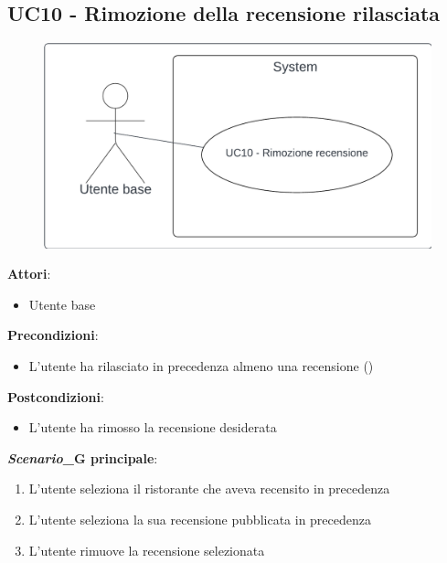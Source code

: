 \subsection{UC10 - Rimozione della recensione rilasciata} \label{usecase:10}
\begin{figure}[H]
    \centering
    \includegraphics[width=0.75\linewidth]{ucd/UCD10.png}
\end{figure}
\textbf{Attori}:
\begin{itemize}
    \item Utente base
\end{itemize}
\textbf{Precondizioni}:
\begin{itemize}
    \item L'utente ha rilasciato in precedenza almeno una recensione ()
\end{itemize}
\textbf{Postcondizioni}:
\begin{itemize}
    \item L'utente ha rimosso la recensione desiderata
\end{itemize}
\textbf{\textit{Scenario}_G principale}:
\begin{enumerate}
    \item L'utente seleziona il ristorante che aveva recensito in precedenza
    \item L'utente seleziona la sua recensione pubblicata in precedenza
    \item L'utente rimuove la recensione selezionata
\end{enumerate}
\newpage
